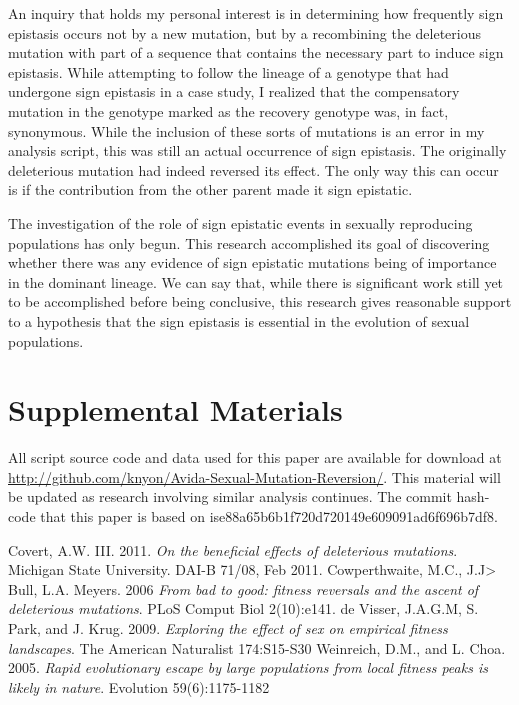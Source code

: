 \documentclass[a4paper, 10pt]{article}
\begin{document}
An inquiry that holds my personal interest is in determining how frequently sign epistasis occurs not by a new mutation, but by a recombining the deleterious mutation with part of a sequence that contains the necessary part to induce sign epistasis. While attempting to follow the lineage of a genotype that had undergone sign epistasis in a case study, I realized that the compensatory mutation in the genotype marked as the recovery genotype was, in fact, synonymous. While the inclusion of these sorts of mutations is an error in my analysis script, this was still an actual occurrence of sign epistasis. The originally deleterious mutation had indeed reversed its effect. The only way this can occur is if the contribution from the other parent made it sign epistatic.

The investigation of the role of sign epistatic events in sexually reproducing populations has only begun. This research accomplished its goal of discovering whether there was any evidence of sign epistatic mutations being of importance in the dominant lineage. We can say that, while there is significant work still yet to be accomplished before being conclusive, this research gives reasonable support to a hypothesis that the sign epistasis is essential in the evolution of sexual populations.

\section{Supplemental Materials}
All script source code and data used for this paper are available for download at \newline \underline{http://github.com/knyon/Avida-Sexual-Mutation-Reversion/}. This material will be updated as research involving similar analysis continues. The commit hash-code that this paper is based on is\newline e88a65b6b1f720d720149e609091ad6f696b7df8.

\begin{thebibliography}{1}

   Covert, A.W. III. 2011. {\em On the beneficial effects of deleterious mutations}. Michigan State University. DAI-B 71/08, Feb 2011.
   Cowperthwaite, M.C., J.J> Bull, L.A. Meyers. 2006 {\em From bad to good: fitness reversals and the ascent of deleterious mutations}. PLoS Comput Biol 2(10):e141.
   de Visser, J.A.G.M, S. Park, and J. Krug. 2009. {\em Exploring the effect of sex on empirical fitness landscapes}. The American Naturalist 174:S15-S30
   Weinreich, D.M., and L. Choa. 2005. {\em Rapid evolutionary escape by large populations from local fitness peaks is likely in nature}. Evolution 59(6):1175-1182

  \end{thebibliography}
\end{document}
